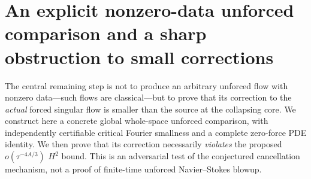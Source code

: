 
\section{An explicit nonzero-data unforced comparison and a sharp obstruction to small corrections}
\label{sec:xxxiv-explicit-comparison}

The central remaining step is not to produce an arbitrary
unforced flow with nonzero data---such flows are classical---but to
prove that its correction to the \emph{actual} forced singular
flow is smaller than the source at the collapsing core.
We construct here a concrete global whole-space unforced comparison,
with independently certifiable critical Fourier smallness and
a complete zero-force PDE identity. We then prove that its correction
necessarily \emph{violates} the proposed
$o(\tau^{-4A/3})$ $H^2$ bound. This is an adversarial
test of the conjectured cancellation mechanism, not a proof of
finite-time unforced Navier--Stokes blowup.

